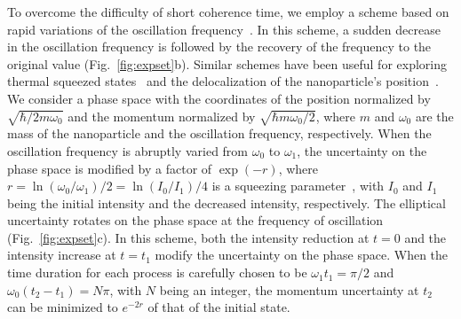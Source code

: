 \documentclass[aps, prl, 
amsmath, showpacs, preprintnumbers, twocolumn, amssymb, amsmath, superscriptaddress]{revtex4-1}
\begin{document}
To overcome the difficulty of short coherence time, we employ a scheme based on rapid variations of the oscillation frequency~\cite{xin2021rapid,wu2024squeezing,genoni2015quantum}.  In this scheme, a sudden decrease in the oscillation frequency is followed by the recovery of the frequency to the original value (Fig.~\ref{fig:expset}b).  Similar schemes have been useful for exploring thermal squeezed states~\cite{rashid2016experimental} and the delocalization of the nanoparticle's position~\cite{rossi2024quantum,muffato2024coherent}. We consider a phase space with the coordinates of the position normalized by $\sqrt{\hbar/2m\omega_0}$ and the momentum normalized by $\sqrt{\hbar m \omega_0/2}$, where $m$ and $\omega_0$ are the mass of the nanoparticle and the oscillation frequency, respectively. When the oscillation frequency is abruptly varied from $\omega_0$ to $\omega_1$, the uncertainty on the phase space is modified by a factor of $\exp(-r)$, where $r=\ln (\omega_0/\omega_1)/2=\ln (I_0/I_1)/4$ is a squeezing parameter~\cite{xin2021rapid}, with $I_0$ and $I_1$ being the initial intensity and the decreased intensity, respectively. The elliptical uncertainty rotates on the phase space at the frequency of oscillation (Fig.~\ref{fig:expset}c). In this scheme, both the intensity reduction at $t=0$ and the intensity increase at $t=t_1$ modify the uncertainty on the phase space. When the time duration for each process is carefully chosen to be $\omega_1 t_1 = \pi/2$ and $\omega_0 (t_2-t_1)=N \pi$, with $N$ being an integer, the momentum uncertainty at $t_2$ can be minimized to $e^{-2r}$ of that of the initial state.  
\end{document}
